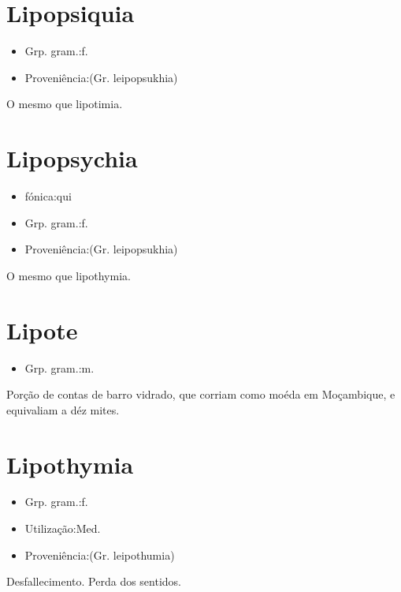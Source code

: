 \section{Lipopsiquia}
\begin{itemize}
\item {Grp. gram.:f.}
\end{itemize}
\begin{itemize}
\item {Proveniência:(Gr. \textunderscore leipopsukhia\textunderscore )}
\end{itemize}
O mesmo que \textunderscore lipotimia\textunderscore .
\section{Lipopsychia}
\begin{itemize}
\item {fónica:qui}
\end{itemize}
\begin{itemize}
\item {Grp. gram.:f.}
\end{itemize}
\begin{itemize}
\item {Proveniência:(Gr. \textunderscore leipopsukhia\textunderscore )}
\end{itemize}
O mesmo que \textunderscore lipothymia\textunderscore .
\section{Lipote}
\begin{itemize}
\item {Grp. gram.:m.}
\end{itemize}
Porção de contas de barro vidrado, que corriam como moéda em Moçambique, e equivaliam a déz mites.
\section{Lipothymia}
\begin{itemize}
\item {Grp. gram.:f.}
\end{itemize}
\begin{itemize}
\item {Utilização:Med.}
\end{itemize}
\begin{itemize}
\item {Proveniência:(Gr. \textunderscore leipothumia\textunderscore )}
\end{itemize}
Desfallecimento.
Perda dos sentidos.
